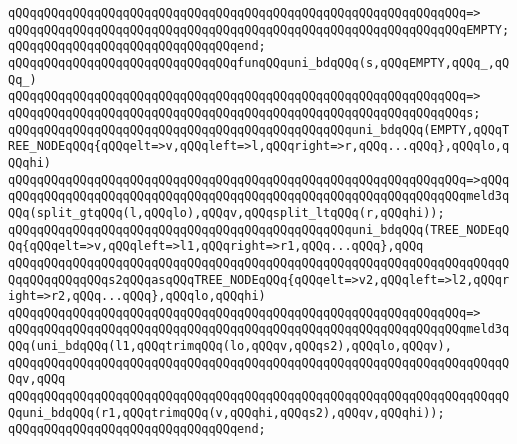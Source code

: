 \verb|qQQqqQQqqQQqqQQqqQQqqQQqqQQqqQQqqQQqqQQqqQQqqQQqqQQqqQQqqQQqqQQq=>|\newline
\verb|qQQqqQQqqQQqqQQqqQQqqQQqqQQqqQQqqQQqqQQqqQQqqQQqqQQqqQQqqQQqqQQqEMPTY;|\newline
\verb|qQQqqQQqqQQqqQQqqQQqqQQqqQQqqQQqend;|\newline
\newline
\verb|qQQqqQQqqQQqqQQqqQQqqQQqqQQqqQQqfunqQQquni_bdqQQq(s,qQQqEMPTY,qQQq_,qQQq_)|\newline
\verb|qQQqqQQqqQQqqQQqqQQqqQQqqQQqqQQqqQQqqQQqqQQqqQQqqQQqqQQqqQQqqQQq=>|\newline
\verb|qQQqqQQqqQQqqQQqqQQqqQQqqQQqqQQqqQQqqQQqqQQqqQQqqQQqqQQqqQQqqQQqs;|\newline
\newline
\verb|qQQqqQQqqQQqqQQqqQQqqQQqqQQqqQQqqQQqqQQqqQQqqQQquni_bdqQQq(EMPTY,qQQqTREE_NODEqQQq{qQQqelt=>v,qQQqleft=>l,qQQqright=>r,qQQq...qQQq},qQQqlo,qQQqhi)|\newline
\verb|qQQqqQQqqQQqqQQqqQQqqQQqqQQqqQQqqQQqqQQqqQQqqQQqqQQqqQQqqQQqqQQq=>qQQq|\newline
\verb|qQQqqQQqqQQqqQQqqQQqqQQqqQQqqQQqqQQqqQQqqQQqqQQqqQQqqQQqqQQqqQQqmeld3qQQq(split_gtqQQq(l,qQQqlo),qQQqv,qQQqsplit_ltqQQq(r,qQQqhi));|\newline
\newline
\verb|qQQqqQQqqQQqqQQqqQQqqQQqqQQqqQQqqQQqqQQqqQQqqQQquni_bdqQQq(TREE_NODEqQQq{qQQqelt=>v,qQQqleft=>l1,qQQqright=>r1,qQQq...qQQq},qQQq|\newline
\verb|qQQqqQQqqQQqqQQqqQQqqQQqqQQqqQQqqQQqqQQqqQQqqQQqqQQqqQQqqQQqqQQqqQQqqQQqqQQqqQQqqQQqs2qQQqasqQQqTREE_NODEqQQq{qQQqelt=>v2,qQQqleft=>l2,qQQqright=>r2,qQQq...qQQq},qQQqlo,qQQqhi)|\newline
\verb|qQQqqQQqqQQqqQQqqQQqqQQqqQQqqQQqqQQqqQQqqQQqqQQqqQQqqQQqqQQqqQQq=>|\newline
\verb|qQQqqQQqqQQqqQQqqQQqqQQqqQQqqQQqqQQqqQQqqQQqqQQqqQQqqQQqqQQqqQQqmeld3qQQq(uni_bdqQQq(l1,qQQqtrimqQQq(lo,qQQqv,qQQqs2),qQQqlo,qQQqv),|\newline
\verb|qQQqqQQqqQQqqQQqqQQqqQQqqQQqqQQqqQQqqQQqqQQqqQQqqQQqqQQqqQQqqQQqqQQqqQQqv,qQQq|\newline
\verb|qQQqqQQqqQQqqQQqqQQqqQQqqQQqqQQqqQQqqQQqqQQqqQQqqQQqqQQqqQQqqQQqqQQqqQQquni_bdqQQq(r1,qQQqtrimqQQq(v,qQQqhi,qQQqs2),qQQqv,qQQqhi));|\newline
\verb|qQQqqQQqqQQqqQQqqQQqqQQqqQQqqQQqend;|\newline
\newline
\newline
